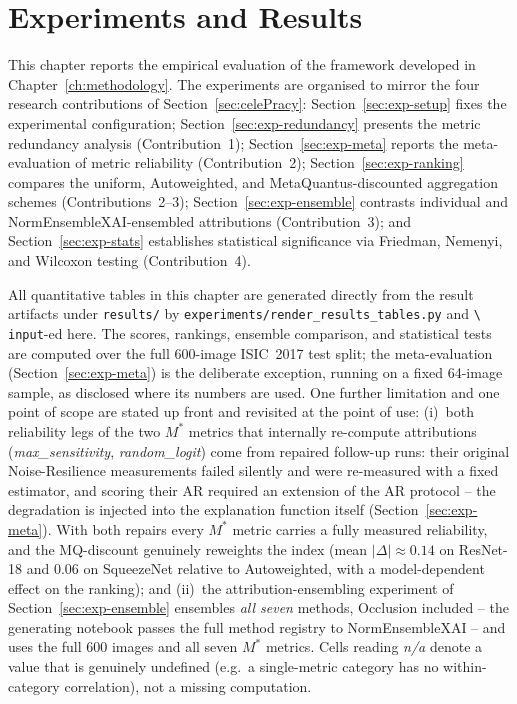 \chapter{Experiments and Results}
\label{ch:experiments}

This chapter reports the empirical evaluation of the framework developed in
Chapter~\ref{ch:methodology}. The experiments are organised to mirror the four
research contributions of Section~\ref{sec:celePracy}:
Section~\ref{sec:exp-setup} fixes the experimental configuration;
Section~\ref{sec:exp-redundancy} presents the metric redundancy analysis
(Contribution~1); Section~\ref{sec:exp-meta} reports the meta-evaluation of
metric reliability (Contribution~2); Section~\ref{sec:exp-ranking} compares the
uniform, Autoweighted, and MetaQuantus-discounted aggregation schemes
(Contributions~2--3); Section~\ref{sec:exp-ensemble} contrasts individual and
NormEnsembleXAI-ensembled attributions (Contribution~3); and
Section~\ref{sec:exp-stats} establishes statistical significance via Friedman,
Nemenyi, and Wilcoxon testing (Contribution~4).

All quantitative tables in this chapter are generated directly from the
result artifacts under \texttt{results/} by
\texttt{experiments/render\_results\_tables.py} and \texttt{\textbackslash
input}-ed here. The scores, rankings, ensemble comparison, and statistical
tests are computed over the full 600-image ISIC~2017 test split; the
meta-evaluation (Section~\ref{sec:exp-meta}) is the deliberate exception,
running on a fixed 64-image sample, as disclosed where its numbers are used.
One further
limitation and one point of scope are stated up front and revisited at the
point of use: (i)~both reliability legs of the two $M^{*}$
metrics that internally re-compute attributions (\emph{max\_sensitivity},
\emph{random\_logit}) come from repaired follow-up runs: their original
Noise-Resilience measurements failed silently and were re-measured with a
fixed estimator, and scoring their AR required an extension
of the AR protocol -- the
degradation is injected into the explanation function itself
(Section~\ref{sec:exp-meta}). With both repairs every $M^{*}$ metric
carries a fully measured reliability, and the MQ-discount genuinely
reweights the index (mean $|\Delta|\approx0.14$ on ResNet-18 and $0.06$ on
SqueezeNet relative to Autoweighted,
with a model-dependent effect on the ranking); and (ii)~the attribution-ensembling
experiment of Section~\ref{sec:exp-ensemble} ensembles \emph{all seven}
methods, Occlusion included -- the generating notebook passes the full
method registry to NormEnsembleXAI -- and uses the full 600 images and all
seven $M^{*}$ metrics.
Cells reading \textit{n/a} denote a value
that is genuinely undefined (e.g.\ a single-metric category has no
within-category correlation), not a missing computation.

